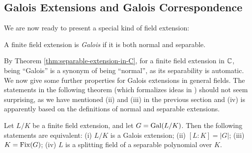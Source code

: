
 \subsection{Galois Extensions and Galois Correspondence}


We are now ready to present a special kind of field extension:

\begin{definition}
    A finite field extension is \textit{Galois} if it is both normal and separable. 
\end{definition}

By Theorem \ref{thm:separable-extension-in-C}, for a finite field extension in $\mathbb C$, being ``Galois'' is a synonym of being ``normal'', as its separability is automatic. 
We now give some further properties for Galois extensions in general fields. The statements in the following theorem (which formalizes ideas in \cite{galois-theory-lectures}) should not seem surprising, as we have mentioned (ii) and (iii) in the previous section and (iv) is apparently based on the definitions of normal and separable extensions. 


\begin{theorem} \label{thm:fixed}
	Let $L/K$ be a finite field extension, and let $G = \operatorname{Gal}(L/K)$. Then the following statements are equivalent:
 	(i) $L/K$ is a Galois extension;
	  (ii) $[L:K] = |G|$;
	  (iii) $K = \operatorname{Fix}(G)$;
	  (iv) $L$ is a splitting field of a separable polynomial over $K$.
\end{theorem}

